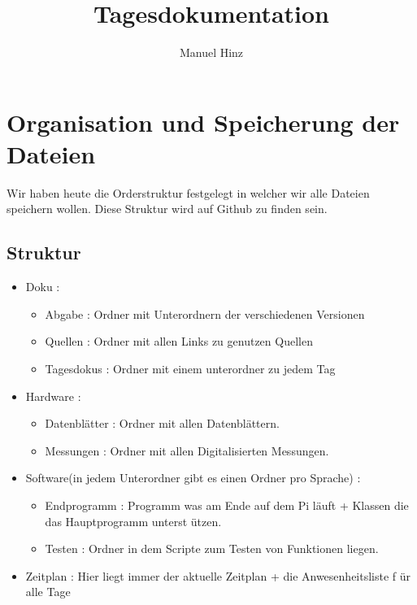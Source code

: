 \documentclass{article}
\author{Manuel Hinz}
\title{Tagesdokumentation}
\begin{document}
\maketitle

\section{Organisation und Speicherung der Dateien}
Wir haben heute die Orderstruktur festgelegt in welcher wir alle Dateien speichern wollen. Diese Struktur wird auf Github zu finden sein.
\subsection{Struktur}

\begin{itemize}

\item Doku : 
\begin{itemize}

\item Abgabe : Ordner mit Unterordnern der verschiedenen Versionen

\item Quellen : Ordner mit allen Links zu genutzen Quellen 

\item Tagesdokus : Ordner mit einem unterordner zu jedem Tag

\end{itemize}

\item Hardware :
\begin{itemize}

\item Datenbl\"{a}tter : Ordner mit allen Datenbl\"{a}ttern.

\item Messungen : Ordner mit allen Digitalisierten Messungen.

\end{itemize}

\item Software(in jedem Unterordner gibt es einen Ordner pro Sprache) :
\begin{itemize}

\item Endprogramm : Programm was am Ende auf dem Pi l\"{a}uft + Klassen die das Hauptprogramm unterst
\"{u}tzen.

\item Testen : Ordner in dem Scripte zum Testen von Funktionen liegen.

\end{itemize}

\item Zeitplan : Hier liegt immer der aktuelle Zeitplan + die Anwesenheitsliste f
\"{u}r alle Tage

\end{itemize}
\end{document}
